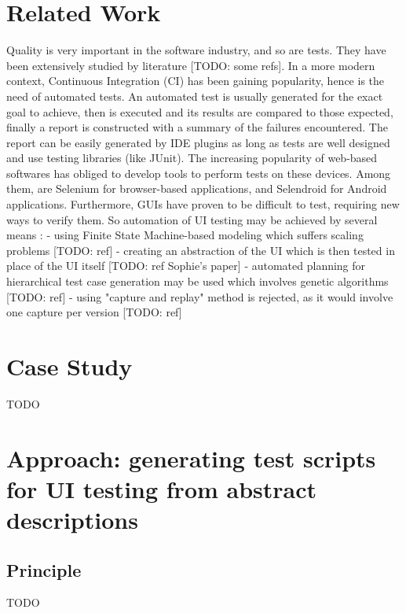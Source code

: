 \documentclass{chi-ext}
\begin{document}
\section{Related Work}
Quality is very important in the software industry, and so are tests. They have been extensively studied by literature [TODO: some refs].
In a more modern context, Continuous Integration (CI) has been gaining popularity, hence is the need of automated tests.
An automated test is usually generated for the exact goal to achieve, then is executed and its results are compared to those expected, finally a report is constructed with a summary of the failures encountered. The report can be easily generated by IDE plugins as long as tests are well designed and use testing libraries (like JUnit). 
The increasing popularity of web-based softwares has obliged to develop tools to perform tests on these devices. Among them, are Selenium for browser-based applications, and Selendroid for Android applications.
Furthermore, GUIs have proven to be difficult to test, requiring new ways to verify them.
So automation of UI testing may be achieved by several means :
- using Finite State Machine-based modeling which suffers scaling problems [TODO: ref]
- creating an abstraction of the UI which is then tested in place of the UI itself [TODO: ref Sophie's paper]
- automated planning for hierarchical test case generation may be used which involves genetic algorithms [TODO: ref]
- using "capture and replay" method is rejected, as it would involve one capture per version [TODO: ref]

\section{Case Study}
TODO

\section{Approach: generating test scripts for UI testing from abstract descriptions}
\subsection{Principle}
TODO
\end{document}
